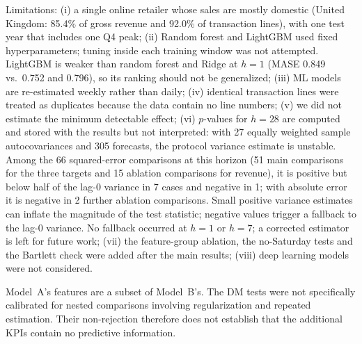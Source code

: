 \documentclass[conference]{IEEEtran}
\begin{document}
Limitations: (i) a single online retailer whose sales are mostly domestic (United Kingdom: 85.4\% of gross %
revenue and 92.0\% of transaction lines), with one test year that includes one Q4 peak; %
(ii) Random forest and LightGBM used fixed hyperparameters; tuning inside each training window was not
attempted. LightGBM is weaker than random forest and Ridge at $h=1$ (MASE 0.849 vs.\ 0.752 and 0.796), so its
ranking should not be generalized; (iii) ML models are re-estimated weekly rather than daily; (iv) identical
transaction lines were treated as duplicates because the data contain no line numbers; (v) we did not
estimate the minimum detectable effect;
(vi) $p$-values for $h=28$ are computed and stored with the results but not interpreted: with 27 equally
weighted sample autocovariances and 305 forecasts, the protocol variance estimate is unstable. Among the 66
squared-error comparisons at this horizon (51 main comparisons for the three targets and 15 ablation %
comparisons for revenue), it is positive but below half of the lag-0 variance in 7 cases and negative in 1; %
with absolute error it is negative in 2 further ablation comparisons.
Small positive variance estimates can inflate the magnitude of the test statistic; negative values trigger a
fallback to the lag-0 variance. No fallback occurred at $h=1$ or $h=7$;
a corrected estimator is left for future work; (vii) the feature-group
ablation, the no-Saturday tests and the Bartlett check were added after the main results; (viii) deep
learning models were not considered.

Model~A's features are a subset of Model~B's. The DM tests were not specifically calibrated for nested
comparisons involving regularization and repeated estimation. Their non-rejection therefore does not
establish that the additional KPIs contain no predictive information.

\end{document}
